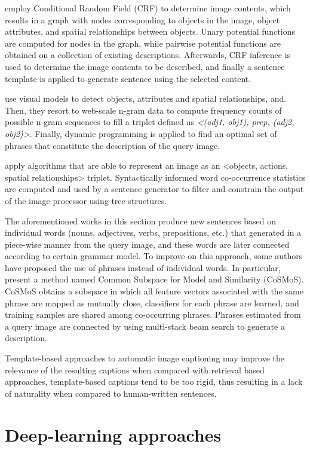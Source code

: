 \citet{Kulkarni2011} employ Conditional Random Field (CRF) to determine image contents, which results in a graph with nodes corresponding to objects in the image, object attributes, and spatial relationships between objects. Unary potential functions are computed for nodes in the graph, while pairwise potential functions are obtained on a collection of existing descriptions. Afterwards, CRF inference is used to determine the image contents to be described, and finally a sentence template is applied to generate sentence using the selected content.

\citet{Li2011} use visual models to detect objects, attributes and spatial relationships, and. Then, they resort to web-scale n-gram data to compute frequency counts of possible n-gram sequences to fill a triplet defined as \textit{<(adj1, obj1), prep, (adj2, obj2)>}. Finally, dynamic programming is applied to find an optimal set of phrases that constitute the description of the query image.

\citet{Mitchell2012} apply algorithms that are able to represent an image as an <objects, actions, spatial relationships> triplet. Syntactically informed word co-occurrence statistics are computed and used by a sentence generator to filter and constrain the output of the image processor using tree structures.

The aforementioned works in this section produce new sentences based on individual words (nouns, adjectives, verbs, prepositions, etc.) that generated in a piece-wise manner from the query image, and these words are later connected according to certain grammar model. To improve on this approach, some authors have proposed the use of phrases instead of individual words. In particular, \citet{Ushiku2015} present a method named Common Subspace for Model and Similarity (CoSMoS). CoSMoS obtains a subspace in which all feature vectors associated with the same phrase are mapped as mutually close, classifiers for each phrase are learned, and training samples are shared among co-occurring phrases. Phrases estimated from a query image are connected by using multi-stack beam search to generate a description.

Template-based approaches to automatic image captioning may improve the relevance of the resulting captions when compared with retrieval based approaches, template-based captions tend to be too rigid, thus resulting in a lack of naturality when compared to human-written sentences.

\section{Deep-learning approaches}\label{sec:deep-learning_methods}

